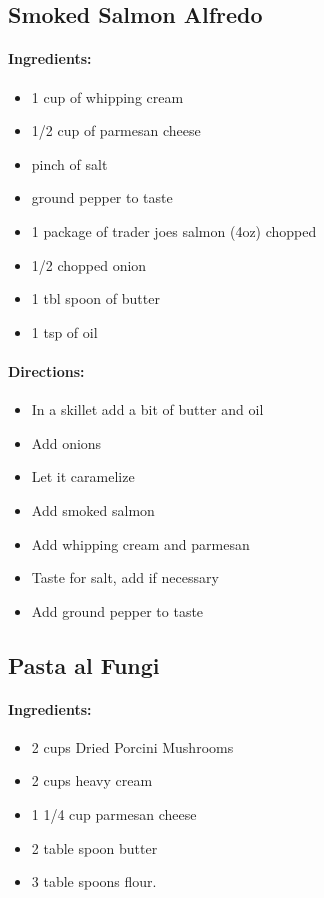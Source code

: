 \documentclass{article}
\begin{document}
\subsection{Smoked Salmon Alfredo}

\paragraph{Ingredients:}
\begin{itemize}
    \item 1 cup of whipping cream
    \item 1/2 cup of parmesan cheese
    \item pinch of salt
    \item ground pepper to taste
    \item 1 package of trader joes salmon (4oz) chopped
    \item 1/2 chopped onion
    \item 1 tbl spoon of butter
    \item 1 tsp of oil
\end{itemize}

\paragraph{Directions:}
\begin{itemize}
    \item In a skillet add a bit of butter and oil
    \item Add onions
    \item Let it caramelize
    \item Add smoked salmon
    \item Add whipping cream and parmesan
    \item Taste for salt, add if necessary
    \item Add ground pepper to taste
\end{itemize}

\subsection{Pasta al Fungi}

\paragraph{Ingredients:}
\begin{itemize}
    \item 2 cups Dried Porcini Mushrooms
    \item 2 cups heavy cream
    \item 1 1/4 cup parmesan cheese
    \item 2 table spoon butter
    \item 3 table spoons flour.
\end{itemize}
\end{document}
